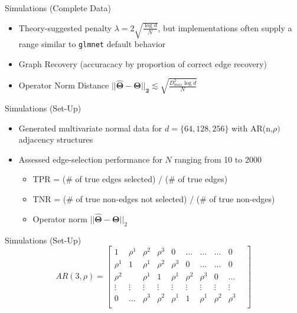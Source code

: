 \documentclass{beamer}
\begin{document}
\begin{frame}{Simulations (Complete Data)}
    \begin{itemize}\setlength\itemsep{6mm}
        \item Theory-suggested penalty $\lambda = 2\sqrt{\frac{\log d}{N}}$, but implementations often supply a range similar to \texttt{glmnet} default behavior
        \item Graph Recovery (accuracacy by proportion of correct edge recovery)
        \item Operator Norm Distance $\mathbf{||\hat\Theta - \Theta||_2} \lesssim \sqrt{\frac{D_{max}^2\log d}{N}}$ 
    \end{itemize}
\end{frame}

\begin{frame}{Simulations (Set-Up)}
    \begin{itemize}\setlength\itemsep{8mm}
        \item Generated multivariate normal data for $d=\{64, 128, 256\}$ with AR(n,$\rho)$ adjacency structures
        \item Assessed edge-selection performance for $N$ ranging from 10 to 2000 
            \begin{itemize}
                \item TPR = (\# of true edges selected) / (\# of true edges)
                \item TNR = (\# of true non-edges not selected) / (\# of true non-edges)
                \item Operator norm $||\mathbf{\hat\Theta - \Theta}||_2$
            \end{itemize}
    \end{itemize}
\end{frame}


\begin{frame}{Simulations (Set-Up)}
    \[
    AR(3, \rho) = \begin{bmatrix}
        1 & \rho^1 & \rho^2 & \rho^3 &  0 & \dots & \dots & \dots & 0 \\
        \rho^1 & 1 & \rho^1 & \rho^2 & \rho^3 &  0 & \dots & \dots & 0 \\
        \rho^2 & & \rho^1 & 1 & \rho^1 & \rho^2 & \rho^3 & 0 & \dots\\
        \vdots &\vdots &\vdots &\vdots &\vdots &\vdots &\vdots &\vdots &\vdots &\\
        0 & \dots & \rho^3 & \rho^2 & \rho^1 & 1 & \rho^1 & \rho^2 & \rho^3 \\ 
    \end{bmatrix}
    \]
\end{frame}
\end{document}
